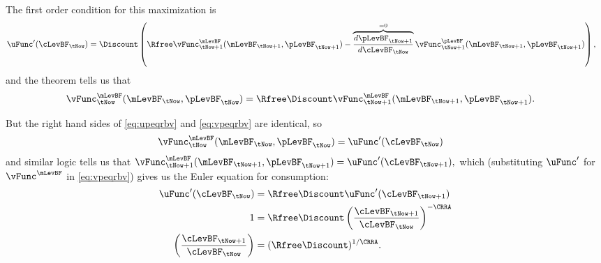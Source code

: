 The first order condition for this maximization is
\begin{equation}\begin{gathered}\begin{aligned}
        \uFunc^{\prime}(\cLevBF_{\tNow}) & =  \Discount \left(\Rfree \vFunc_{\tNow+1}^{\mLevBF}(\mLevBF_{\tNow+1},\pLevBF_{\tNow+1})-\overbrace{\frac{d\pLevBF_{\tNow+1}}{d \cLevBF_{\tNow}}}^{=0}\vFunc_{\tNow+1}^{\pLevBF}(\mLevBF_{\tNow+1},\pLevBF_{\tNow+1})\right), \label{eq:upeqrbv}
\end{aligned}\end{gathered}\end{equation}
and the  theorem tells us that
\begin{equation}\begin{gathered}\begin{aligned}
        \vFunc_{\tNow}^{\mLevBF}(\mLevBF_{\tNow},\pLevBF_{\tNow}) & =  \Rfree \Discount \vFunc_{\tNow+1}^{\mLevBF}(\mLevBF_{\tNow+1},\pLevBF_{\tNow+1}). \label{eq:vpeqrbv}
\end{aligned}\end{gathered}\end{equation}

But the right hand sides of \eqref{eq:upeqrbv} and \eqref{eq:vpeqrbv}
are identical, so
\begin{equation}\begin{gathered}\begin{aligned}
        \vFunc_{\tNow}^{\mLevBF}(\mLevBF_{\tNow},\pLevBF_{\tNow}) & =  \uFunc^{\prime}(\cLevBF_{\tNow})
\end{aligned}\end{gathered}\end{equation}
and similar logic tells us that $\vFunc_{\tNow+1}^{\mLevBF}(\mLevBF_{\tNow+1},\pLevBF_{\tNow+1})=\uFunc^{\prime}(\cLevBF_{\tNow+1}),$ which
(substituting $\uFunc^{\prime}$ for $\vFunc^{\mLevBF}$ in \eqref{eq:vpeqrbv}) gives us the \hypertarget{EulerCGroFac}{Euler
equation for consumption}:
\begin{equation}\begin{gathered}\begin{aligned}
        \uFunc^{\prime}(\cLevBF_{\tNow}) & =  \Rfree\Discount \uFunc^{\prime}(\cLevBF_{\tNow+1}) \\
        1 & =  \Rfree\Discount \left(\frac{\cLevBF_{\tNow+1}}{\cLevBF_{\tNow}}\right)^{-\CRRA}
\\  \left(\frac{\cLevBF_{\tNow+1}}{\cLevBF_{\tNow}}\right) & =  (\Rfree\Discount)^{1/\CRRA} \label{eq:cgrow}
.
\end{aligned}\end{gathered}\end{equation}

